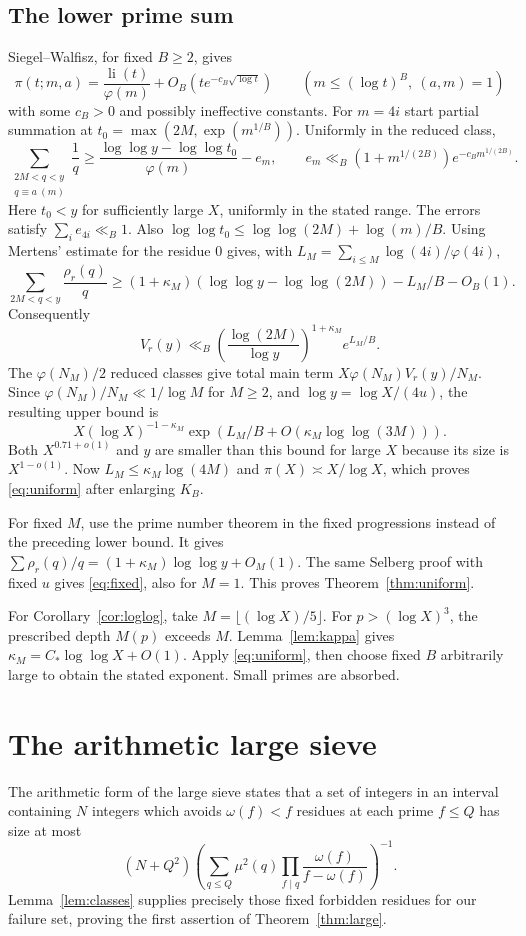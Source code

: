 \documentclass[11pt,a4paper]{amsart}
\theoremstyle{definition}\newtheorem{definition}[theorem]{Definition}
\DeclareMathOperator{\li}{li}
\begin{document}
\subsection{The lower prime sum}
Siegel--Walfisz, for fixed $B\ge2$, gives
\[
 \pi(t;m,a)=\frac{\li(t)}{\varphi(m)}
             +O_B(t e^{-c_B\sqrt{\log t}})
 \qquad(m\le(\log t)^B,\ (a,m)=1)
\]
with some $c_B>0$ and possibly ineffective constants.
For $m=4i$ start partial summation at
$t_0=\max(2M,\exp(m^{1/B}))$. Uniformly in the reduced class,
\[
 \sum_{\substack{2M<q<y\\q\equiv a\ (m)}}\frac1q
 \ge\frac{\log\log y-\log\log t_0}{\varphi(m)}-e_m,
 \qquad
 e_m\ll_B(1+m^{1/(2B)})e^{-c_Bm^{1/(2B)}}.
\]
Here $t_0<y$ for sufficiently large $X$, uniformly in the
stated range. The errors satisfy $\sum_i e_{4i}\ll_B1$.
Also
$\log\log t_0\le\log\log(2M)+\log(m)/B$.
Using Mertens' estimate for the residue $0$ gives, with
$L_M=\sum_{i\le M}\log(4i)/\varphi(4i)$,
\[
 \sum_{2M<q<y}\frac{\rho_r(q)}q
 \ge(1+\kappa_M)(\log\log y-\log\log(2M))-L_M/B-O_B(1).
\]
Consequently
\[
 V_r(y)\ll_B
 \left(\frac{\log(2M)}{\log y}\right)^{1+\kappa_M}
 e^{L_M/B}.
\]
The $\varphi(N_M)/2$ reduced classes give total main term
$X\varphi(N_M)V_r(y)/N_M$.
Since $\varphi(N_M)/N_M\ll1/\log M$ for $M\ge2$, and
$\log y=\log X/(4u)$, the resulting upper bound is
\[
 X(\log X)^{-1-\kappa_M}
 \exp\left(L_M/B+O(\kappa_M\log\log(3M))\right).
\]
Both $X^{0.71+o(1)}$ and $y$ are smaller than this bound for
large $X$ because its size is $X^{1-o(1)}$.
Now $L_M\le\kappa_M\log(4M)$ and $\pi(X)\asymp X/\log X$,
which proves \eqref{eq:uniform} after enlarging $K_B$.

For fixed $M$, use the prime number theorem in the fixed
progressions instead of the preceding lower bound.
It gives $\sum\rho_r(q)/q=(1+\kappa_M)\log\log y+O_M(1)$.
The same Selberg proof with fixed $u$ gives \eqref{eq:fixed},
also for $M=1$. This proves Theorem~\ref{thm:uniform}.

For Corollary~\ref{cor:loglog}, take $M=\lfloor(\log X)/5\rfloor$.
For $p>(\log X)^3$, the prescribed depth $M(p)$ exceeds $M$.
Lemma~\ref{lem:kappa} gives $\kappa_M=C_*\log\log X+O(1)$.
Apply \eqref{eq:uniform}, then choose fixed $B$ arbitrarily large
to obtain the stated exponent. Small primes are absorbed.

\section{The arithmetic large sieve}\label{sec:arithmeticsieve}
The arithmetic form of the large sieve \cite{Montgomery,IK} states
that a set of integers in an interval containing $N$ integers
which avoids $\omega(f)<f$ residues at each prime $f\le Q$ has
size at most
\[
 (N+Q^2)\left(\sum_{q\le Q}\mu^2(q)
           \prod_{f\mid q}\frac{\omega(f)}{f-\omega(f)}\right)^{-1}.
\]
Lemma~\ref{lem:classes} supplies precisely those fixed forbidden
residues for our failure set, proving the first assertion of
Theorem~\ref{thm:large}.
\end{document}
